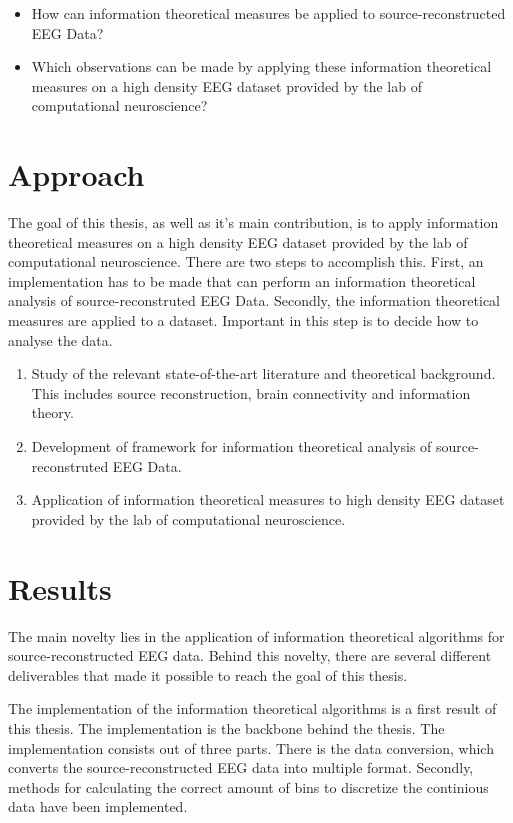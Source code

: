 \begin{itemize}
\item How can information theoretical measures be applied to source-reconstructed EEG Data?
\item Which observations can be made by applying these information theoretical measures on a high density EEG dataset provided by the lab of computational neuroscience?
\end{itemize}

\section{Approach}

The goal of this thesis, as well as it's main contribution, is to apply information theoretical measures on a high density EEG dataset provided by the lab of computational neuroscience. There are two steps to accomplish this. First, an implementation has to be made that can perform an information theoretical analysis of source-reconstruted EEG Data. Secondly, the information theoretical measures are applied to a dataset. Important in this step is to decide how to analyse the data.

\begin{enumerate}
\item Study of the relevant state-of-the-art literature and theoretical background. This includes source reconstruction, brain connectivity and information theory.
\item Development of framework for information theoretical analysis of source-reconstruted EEG Data.
\item Application of information theoretical measures to high density EEG dataset provided by the lab of computational neuroscience.
\end{enumerate}

\section{Results}

The main novelty lies in the application of information theoretical algorithms for source-reconstructed EEG data. Behind this novelty, there are several different deliverables that made it possible to reach the goal of this thesis. 

The implementation of the information theoretical algorithms is a first result of this thesis. The implementation is the backbone behind the thesis. The implementation consists out of three parts. There is the data conversion, which converts the source-reconstructed EEG data into multiple format. Secondly, methods for calculating the correct amount of bins to discretize the continious data have been implemented. 

